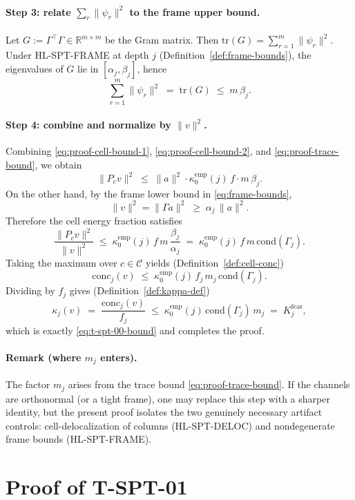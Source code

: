 \documentclass[11pt]{article}
\newcommand{\conc}{\mathrm{conc}}
\begin{document}
\paragraph{Step 3: relate $\sum_r\|\psi_r\|^2$ to the frame upper bound.}
Let $G:=\Gamma^\top\Gamma\in\mathbb{R}^{m\times m}$ be the Gram matrix.
Then $\mathrm{tr}(G)=\sum_{r=1}^m \|\psi_r\|^2$.
Under HL-SPT-FRAME at depth $j$ (Definition~\ref{def:frame-bounds}), the eigenvalues of $G$ lie in $[\alpha_j,\beta_j]$, hence
\begin{equation}\label{eq:proof-trace-bound}
\sum_{r=1}^m \|\psi_r\|^2 \;=\; \mathrm{tr}(G) \;\le\; m\,\beta_j.
\end{equation}

\paragraph{Step 4: combine and normalize by $\|v\|^2$.}
Combining \eqref{eq:proof-cell-bound-1}, \eqref{eq:proof-cell-bound-2}, and \eqref{eq:proof-trace-bound}, we obtain
\[
\|P_c v\|^2
\;\le\;
\|a\|^2\cdot \kappa_0^{\mathrm{emp}}(j)\,f\cdot m\,\beta_j.
\]
On the other hand, by the frame lower bound in \eqref{eq:frame-bounds},
\[
\|v\|^2=\|\Gamma a\|^2 \;\ge\; \alpha_j\,\|a\|^2.
\]
Therefore the cell energy fraction satisfies
\[
\frac{\|P_c v\|^2}{\|v\|^2}
\;\le\;
\kappa_0^{\mathrm{emp}}(j)\,f\,m\,\frac{\beta_j}{\alpha_j}
\;=\;
\kappa_0^{\mathrm{emp}}(j)\,f\,m\,\mathrm{cond}(\Gamma_j).
\]
Taking the maximum over $c\in\mathcal{C}$ yields (Definition~\ref{def:cell-conc})
\[
\conc_j(v) \;\le\; \kappa_0^{\mathrm{emp}}(j)\,f_j\,m_j\,\mathrm{cond}(\Gamma_j).
\]
Dividing by $f_j$ gives (Definition~\ref{def:kappa-def})
\[
\kappa_j(v)
\;=\;
\frac{\conc_j(v)}{f_j}
\;\le\;
\kappa_0^{\mathrm{emp}}(j)\,\mathrm{cond}(\Gamma_j)\,m_j
\;=\;
K^{\mathrm{feas}}_j,
\]
which is exactly \eqref{eq:t-spt-00-bound} and completes the proof.

\paragraph{Remark (where $m_j$ enters).}
The factor $m_j$ arises from the trace bound \eqref{eq:proof-trace-bound}.
If the channels are orthonormal (or a tight frame), one may replace this step with a sharper identity, but the present proof isolates the two genuinely necessary artifact controls:
cell-delocalization of columns (HL-SPT-DELOC) and nondegenerate frame bounds (HL-SPT-FRAME).
 \section{Proof of T-SPT-01}\label{sec:proof-t-spt-01}
\end{document}
